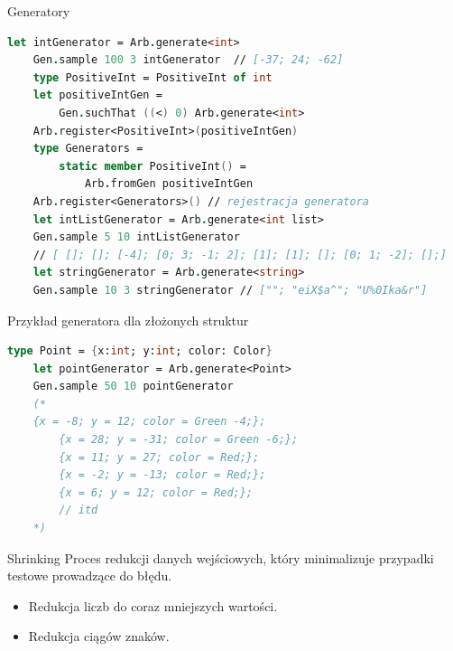     \begin{frame}[fragile]{Generatory}
    \begin{lstlisting}[language=FSharp, xleftmargin=-10pt,xrightmargin=-10pt,numbers=none,basicstyle=\ttfamily\small]
    let intGenerator = Arb.generate<int>
    Gen.sample 100 3 intGenerator  // [-37; 24; -62]
    type PositiveInt = PositiveInt of int  
    let positiveIntGen =
        Gen.suchThat ((<) 0) Arb.generate<int>
    Arb.register<PositiveInt>(positiveIntGen)     
    type Generators =
        static member PositiveInt() =
            Arb.fromGen positiveIntGen
    Arb.register<Generators>() // rejestracja generatora
    let intListGenerator = Arb.generate<int list>
    Gen.sample 5 10 intListGenerator 
    // [ []; []; [-4]; [0; 3; -1; 2]; [1]; [1]; []; [0; 1; -2]; [];]  
    let stringGenerator = Arb.generate<string>
    Gen.sample 10 3 stringGenerator // [""; "eiX$a^"; "U%0Ika&r"]     
    \end{lstlisting}
    \end{frame}
    
    \begin{frame}[fragile]{Przykład generatora dla złożonych struktur}
    \begin{lstlisting}[language=FSharp, xleftmargin=-10pt,xrightmargin=-10pt,numbers=none]
    type Point = {x:int; y:int; color: Color}
    let pointGenerator = Arb.generate<Point>
    Gen.sample 50 10 pointGenerator
    (*
    {x = -8; y = 12; color = Green -4;};
        {x = 28; y = -31; color = Green -6;};
        {x = 11; y = 27; color = Red;};
        {x = -2; y = -13; color = Red;};
        {x = 6; y = 12; color = Red;};
        // itd
    *)
    \end{lstlisting}
    \end{frame}
    
    \begin{frame}[fragile]{Shrinking}
    Proces redukcji danych wejściowych, który minimalizuje przypadki testowe prowadzące do błędu.
    \begin{itemize}
        \item Redukcja liczb do coraz mniejszych wartości.
        \item Redukcja ciągów znaków.
    \end{itemize}
    \end{frame}
    
